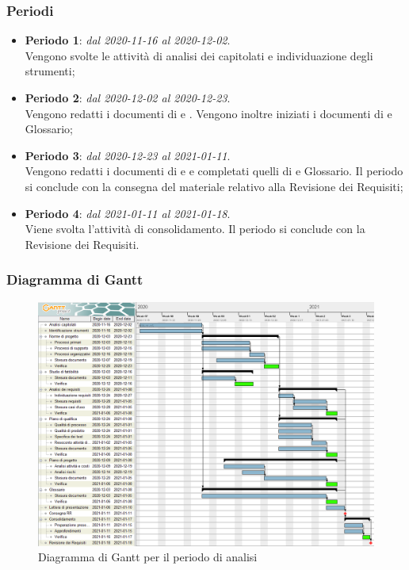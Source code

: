 \subsubsection{Periodi}

\begin{itemize}
\item \textbf{Periodo 1}: \textit{dal 2020-11-16 al 2020-12-02}. \\
Vengono svolte le attività di analisi dei capitolati e individuazione degli strumenti;
\item \textbf{Periodo 2}: \textit{dal 2020-12-02 al 2020-12-23}. \\
Vengono redatti i documenti di \NdP{} e \SdF{}. Vengono inoltre iniziati i documenti di \PdP{} e Glossario;
\item \textbf{Periodo 3}: \textit{dal 2020-12-23 al 2021-01-11}. \\
Vengono redatti i documenti di \PdQ{} e \AdR{} e completati quelli di \PdP{} e Glossario. Il periodo si conclude con la consegna del materiale relativo alla Revisione dei Requisiti;
\item \textbf{Periodo 4}: \textit{dal 2021-01-11 al 2021-01-18}. \\
Viene svolta l'attività di consolidamento. Il periodo si conclude con la Revisione dei Requisiti.
\end{itemize}

\subsubsection{Diagramma di Gantt}

\begin{figure}[H]
\centering

\centerline{\includegraphics[scale=0.6]{res/Pianificazione/Gantt/analisi}}
\caption{Diagramma di Gantt per il periodo di analisi}
\end{figure}
